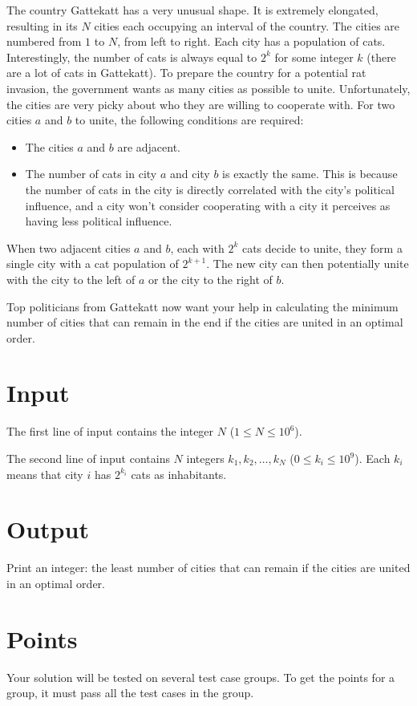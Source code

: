 \noindent
The country Gattekatt has a very unusual shape. It is extremely elongated, resulting in its $N$ cities each occupying an interval of the country.
The cities are numbered from $1$ to $N$, from left to right. Each city has a population of cats. Interestingly, the number of 
cats is always equal to $2^k$ for some integer $k$ (there are a lot of cats in Gattekatt).
To prepare the country for a potential rat invasion, the government wants as many cities as possible to unite.
Unfortunately, the cities are very picky about who they are willing to cooperate with. For two cities $a$ and $b$ to unite, the following conditions are required:

\begin{itemize}
  \item The cities $a$ and $b$ are adjacent. 
  \item The number of cats in city $a$ and city $b$ is exactly the same. This is because the number of cats in the city is
  directly correlated with the city's political influence, and a city won't consider cooperating with a city it perceives as having less political influence.
\end{itemize}

When two adjacent cities $a$ and $b$, each with $2^k$ cats decide to unite, they form a single city with a cat population of $2^{k+1}$.
The new city can then potentially unite with the city to the left of $a$ or the city to the right of $b$.

Top politicians from Gattekatt now want your help in calculating the minimum number of cities that can remain in the end if
the cities are united in an optimal order.

\section*{Input}
The first line of input contains the integer $N$ ($1 \leq N \leq 10^6$).

The second line of input contains $N$ integers $k_1, k_2, \dots, k_N$ ($0 \leq k_i \leq 10^9$).
Each $k_i$ means that city $i$ has $2^{k_i}$ cats as inhabitants. 

\section*{Output}
Print an integer: the least number of cities that can remain if the cities are united in an optimal order.

\section*{Points}
Your solution will be tested on several test case groups.
To get the points for a group, it must pass all the test cases in the group.


